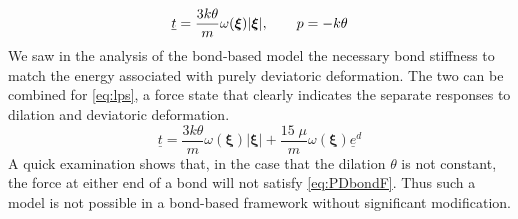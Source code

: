 %
\begin{equation}
\underline{t} = \frac{3k\theta}{m}\omega(\boldsymbol{\xi})|\boldsymbol{\xi}|,\qquad p=-k\theta\notag
\end{equation}
%
We saw in the analysis of the bond-based model the necessary bond stiffness to match the energy associated with purely deviatoric deformation.
The two can be combined for \cref{eq:lps}, a force state that clearly indicates the separate responses to dilation and deviatoric deformation.
%
\begin{equation}
\label{eq:lps}
\underline{t} = \frac{3k\theta}{m}\omega(\boldsymbol{\xi})|\boldsymbol{\xi}| + \frac{15\;\mu}{m}\omega(\boldsymbol{\xi})\underline{e}^d
\end{equation}
%
A quick examination shows that, in the case that the dilation $\theta$ is not constant, the force at either end of a bond will not satisfy \cref{eq:PDbondF}.
Thus such a model is not possible in a bond-based framework without significant modification. 

